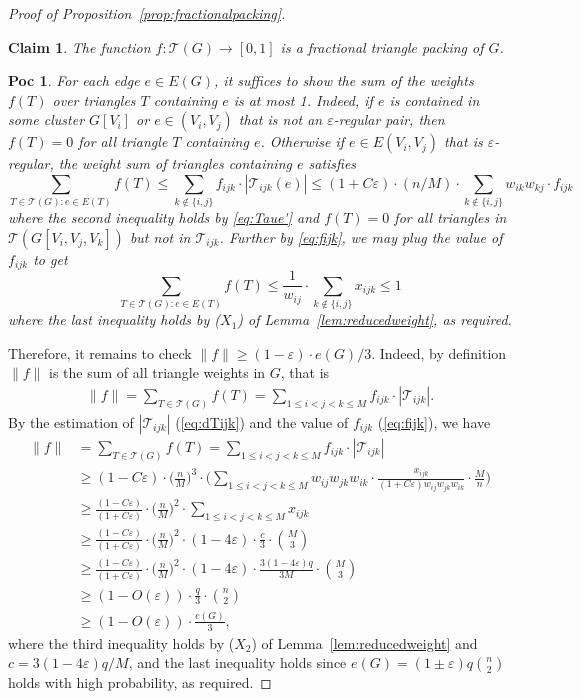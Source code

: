 \documentclass[10pt,a4paper]{amsart}
\newtheorem{claim}{Claim}
\newtheorem{poc}{Poc}
\newcommand\dT{\mathcal{T}}
\renewcommand\geq{\geqslant}
\renewcommand\leq{\leqslant}
\begin{document}
\begin{proof}[Proof of Proposition~\ref{prop:fractionalpacking}]
\begin{claim}
The function $f:\dT(G)\rightarrow [0,1]$ is a fractional triangle packing of $G$.
\end{claim}
\begin{poc}
For each edge $e\in E(G)$, it suffices to show the sum of the weights $f(T)$ over triangles $T$ containing $e$ is at most 1. Indeed, if $e$ is contained in some cluster $G[V_i]$ or $e\in (V_i,V_j)$ that is not an $\varepsilon$-regular pair, then $f(T)=0$ for all triangle $T$ containing $e$. Otherwise if $e\in E(V_i,V_j)$ that is $\varepsilon$-regular, the weight sum of triangles containing $e$ satisfies
$$\sum_{T\in \dT(G): e\in E(T)}f(T)\leq\sum_{k\notin\{i,j\}} f_{ijk}\cdot |\dT_{ijk}(e)|\leq(1+C\varepsilon)\cdot(n/M)\cdot\sum_{k\notin\{i,j\}}w_{ik}w_{kj}\cdot f_{ijk}$$
where the second inequality holds by \eqref{eq:Taue'} and $f(T)=0$ for all triangles in $\dT(G[V_i,V_j,V_k])$ but not in $\dT_{ijk}$. Further by \eqref{eq:fijk}, we may plug the value of $f_{ijk}$ to get
$$\sum_{T\in \dT(G): e\in E(T)}f(T)\leq \frac{1}{w_{ij}}\cdot\sum_{k\notin\{i,j\}}x_{ijk}\leq1$$
where the last inequality holds by ($X_1$) of Lemma~\ref{lem:reducedweight}, as required.
\end{poc}

Therefore, it remains to check $\|f\|\geq(1-\varepsilon)\cdot e(G)/3$. Indeed, by definition $\|f\|$ is the sum of all triangle weights in $G$, that is
\begin{align*}
\|f\|=\sum_{T\in\dT(G)}f(T)=\sum_{1\leq i<j<k\leq M}f_{ijk}\cdot|\dT_{ijk}|.
\end{align*}
By the estimation of $|\dT_{ijk}|$ (\eqref{eq:dTijk}) and the value of $f_{ijk}$ (\eqref{eq:fijk}), we have
\begin{align*}
\|f\|&=\sum_{T\in\dT(G)}f(T)=\sum_{1\leq i<j<k\leq M}f_{ijk}\cdot|\dT_{ijk}|\\
&\geq (1-C\varepsilon)\cdot \bigg(\frac{n}{M}\bigg)^3\cdot \bigg(\sum_{1\leq i<j<k\leq M}  w_{ij}w_{jk}w_{ik}\cdot \frac{x_{ijk}}{(1+C\varepsilon)w_{ij}w_{jk}w_{ik}}\cdot\frac{M}{n}\bigg)\\
&\geq \frac{(1-C\varepsilon)}{(1+C\varepsilon)}\cdot\bigg(\frac{n}{M}\bigg)^2\cdot\sum_{1\leq i<j<k\leq M}x_{ijk}\\
&\geq \frac{(1-C\varepsilon)}{(1+C\varepsilon)}\cdot\bigg(\frac{n}{M}\bigg)^2\cdot (1-4\varepsilon)\cdot \frac{c}{3}\cdot\binom{M}{3}\\
&\geq \frac{(1-C\varepsilon)}{(1+C\varepsilon)}\cdot\bigg(\frac{n}{M}\bigg)^2\cdot (1-4\varepsilon)\cdot \frac{3(1-4\varepsilon)q}{3M}\cdot\binom{M}{3}\\
&\geq (1-O(\varepsilon))\cdot \frac{q}{3}\cdot\binom{n}{2}\\
&\geq (1-O(\varepsilon))\cdot \frac{e(G)}{3},
\end{align*}
where the third inequality holds by ($X_2$) of Lemma~\ref{lem:reducedweight} and $c=3(1-4\varepsilon)q/M$, and the last inequality holds since $e(G)= (1\pm\varepsilon)q\binom{n}{2}$ holds with high probability, as required.
\end{proof}
\end{document}
